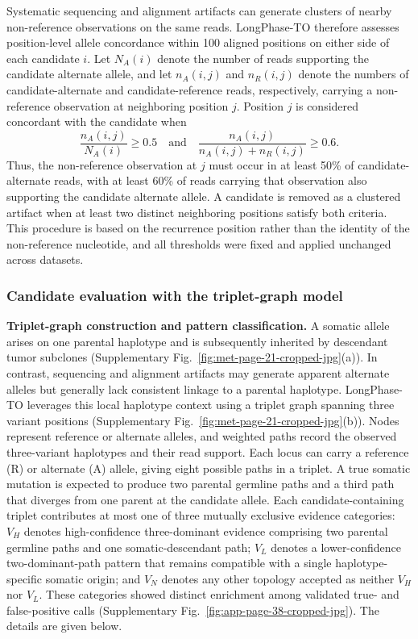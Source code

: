 \documentclass[pdflatex,sn-nature]{sn-jnl}
\begin{document}
Systematic sequencing and alignment artifacts can generate clusters of nearby non-reference observations on the same reads. LongPhase-TO therefore assesses position-level allele concordance within 100 aligned positions on either side of each candidate \(i\). Let \(N_A(i)\) denote the number of reads supporting the candidate alternate allele, and let \(n_A(i,j)\) and \(n_R(i,j)\) denote the numbers of candidate-alternate and candidate-reference reads, respectively, carrying a non-reference observation at neighboring position \(j\). Position \(j\) is considered concordant with the candidate when
\[
\frac{n_A(i,j)}{N_A(i)}\geq0.5
\quad\text{and}\quad
\frac{n_A(i,j)}{n_A(i,j)+n_R(i,j)}\geq0.6.
\]
Thus, the non-reference observation at \(j\) must occur in at least 50\% of candidate-alternate reads, with at least 60\% of reads carrying that observation also supporting the candidate alternate allele. A candidate is removed as a clustered artifact when at least two distinct neighboring positions satisfy both criteria. This procedure is based on the recurrence position rather than the identity of the non-reference nucleotide, and all thresholds were fixed and applied unchanged across datasets.

\subsubsection{Candidate evaluation with the triplet-graph model}

\noindent\textbf{Triplet-graph construction and pattern classification.} A somatic allele arises on one parental haplotype and is subsequently inherited by descendant tumor subclones (Supplementary Fig.~\ref{fig:met-page-21-cropped-jpg}(a)). In contrast, sequencing and alignment artifacts may generate apparent alternate alleles but generally lack consistent linkage to a parental haplotype. LongPhase-TO leverages this local haplotype context using a triplet graph spanning three variant positions (Supplementary Fig.~\ref{fig:met-page-21-cropped-jpg}(b)). Nodes represent reference or alternate alleles, and weighted paths record the observed three-variant haplotypes and their read support. Each locus can carry a reference (R) or alternate (A) allele, giving eight possible paths in a triplet. A true somatic mutation is expected to produce two parental germline paths and a third path that diverges from one parent at the candidate allele. Each candidate-containing triplet contributes at most one of three mutually exclusive evidence categories: \(V_H\) denotes high-confidence three-dominant evidence comprising two parental germline paths and one somatic-descendant path; \(V_L\) denotes a lower-confidence two-dominant-path pattern that remains compatible with a single haplotype-specific somatic origin; and \(V_N\) denotes any other topology accepted as neither \(V_H\) nor \(V_L\). These categories showed distinct enrichment among validated true- and false-positive calls (Supplementary Fig.~\ref{fig:app-page-38-cropped-jpg}). The details are given below.
\end{document}
